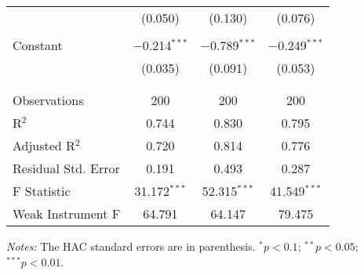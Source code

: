 \documentclass[11pt]{article}
\begin{document}
\begin{table}[!htbp]
\begin{threeparttable}
\begin{tabular}{@{\extracolsep{5pt}}lccc}
      & (0.050) & (0.130) & (0.076) \\ 
      & & & \\ 
     Constant & $-$0.214$^{***}$ & $-$0.789$^{***}$ & $-$0.249$^{***}$ \\ 
      & (0.035) & (0.091) & (0.053) \\ 
      & & & \\ 
    \hline \\[-1.8ex] 
    Observations & 200 & 200 & 200 \\ 
    R$^{2}$ & 0.744 & 0.830 & 0.795 \\ 
    Adjusted R$^{2}$ & 0.720 & 0.814 & 0.776 \\ 
    Residual Std. Error & 0.191 & 0.493 & 0.287 \\ 
    F Statistic & 31.172$^{***}$ & 52.315$^{***}$ & 41.549$^{***}$ \\ 
    Weak Instrument F& 64.791& 64.147& 79.475 \\
    \hline 
    \hline 
    \end{tabular} 
    \begin{tablenotes}[flushleft]
      \item[]\textit{Notes:} The \citet{Andrews1991} HAC standard errors are in parenthesis. $^{*}p<0.1$; $^{**}p<0.05$; $^{***}p<0.01$.
    \end{tablenotes}
  \end{threeparttable}
    \end{table} 






\newpage









\end{document}
